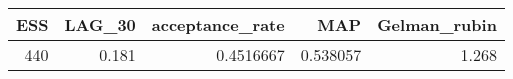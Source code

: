 \begin{longtable}{rrrrr}
\toprule
ESS & LAG\_30 & acceptance\_rate & MAP & Gelman\_rubin \\ 
\midrule
440 & 0.181 & 0.4516667 & 0.538057 & 1.268 \\ 
\bottomrule
\end{longtable}

